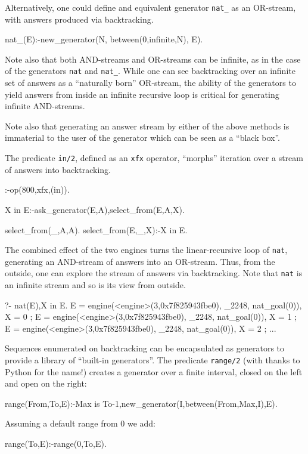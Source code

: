 \documentclass{new_tlp}
\begin{document}
Alternatively, one could define 
and equivalent generator {\tt nat\_} as an OR-stream,  with answers 
produced via  backtracking.

\begin{code}
nat_(E):-new_generator(N, between(0,infinite,N), E).
\end{code}

Note also that both AND-streams and OR-streams can be infinite, as in the
case of the generators {\tt nat} and {\tt nat\_}.
While one can see backtracking over an infinite set of answers as
a ``naturally born'' OR-stream, the ability of the generators to
yield answers from inside an infinite recursive loop is critical
for generating infinite AND-streams.

Note also that generating an answer stream by either of the above methods
is immaterial to the user of the generator which can be seen as a ``black box''.

The predicate {\tt in/2}, defined as an {\tt xfx} operator,
``morphs'' iteration over  a stream of answers into backtracking.
\begin{code}
:-op(800,xfx,(in)).

X in E:-ask_generator(E,A),select_from(E,A,X).

select_from(_,A,A).
select_from(E,_,X):-X in E.
\end{code}

\BX
The combined effect of the two engines turns the linear-recursive loop of {\tt nat},
generating an AND-stream of answers into an OR-stream. Thus, from the outside, one can explore the stream of answers via backtracking. 
Note that {\tt nat} is an infinite stream and so is its
view from outside.
\begin{codex}
?- nat(E),X in E.
E = engine(<engine>(3,0x7f825943fbe0), _2248, nat_goal(0)),
X = 0 ;
E = engine(<engine>(3,0x7f825943fbe0), _2248, nat_goal(0)),
X = 1 ;
E = engine(<engine>(3,0x7f825943fbe0), _2248, nat_goal(0)),
X = 2 ;
...
\end{codex}
\EX

Sequences enumerated on backtracking can be encapsulated as generators to provide a library of ``built-in generators''.
The predicate {\tt range/2} (with thanks to Python for the name!) creates a generator over a finite interval, closed on the left and open on the right:
\begin{code}
range(From,To,E):-Max is To-1,new_generator(I,between(From,Max,I),E).
\end{code}
Assuming a  default range from 0 we add:
\begin{code}
range(To,E):-range(0,To,E).
\end{code}
\end{document}
